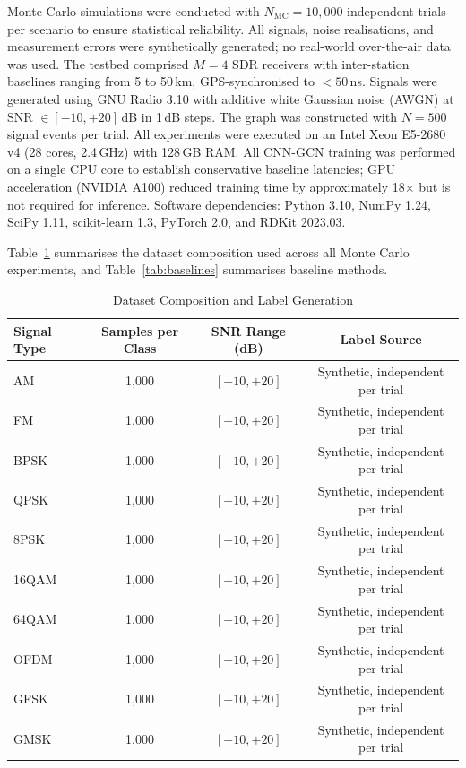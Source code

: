 \documentclass[sensors,article,submit,pdftex]{mdpi}
\begin{document}
Monte Carlo simulations were conducted with $N_{\text{MC}} = 10{,}000$ independent trials per scenario to ensure statistical reliability. All signals, noise realisations, and measurement errors were synthetically generated; no real-world over-the-air data was used. The testbed comprised $M = 4$ SDR receivers with inter-station baselines ranging from 5 to 50\,km, GPS-synchronised to $< 50$\,ns. Signals were generated using GNU Radio 3.10 with additive white Gaussian noise (AWGN) at SNR $\in [-10, +20]$\,dB in 1\,dB steps. The graph was constructed with $N = 500$ signal events per trial. All experiments were executed on an Intel Xeon E5-2680 v4 (28 cores, 2.4\,GHz) with 128\,GB RAM. All CNN-GCN training was performed on a single CPU core to establish conservative baseline latencies; GPU acceleration (NVIDIA A100) reduced training time by approximately 18$\times$ but is not required for inference. Software dependencies: Python 3.10, NumPy 1.24, SciPy 1.11, scikit-learn 1.3, PyTorch 2.0, and RDKit 2023.03.

Table~\ref{tab:dataset} summarises the dataset composition used across all Monte Carlo experiments, and Table~\ref{tab:baselines} summarises baseline methods.

\begin{table}[H]
    \centering
    \caption{Dataset Composition and Label Generation}
    \label{tab:dataset}
    \small
    \begin{tabular}{@{}lccc@{}}
        \toprule
        \textbf{Signal Type} & \textbf{Samples per Class} & \textbf{SNR Range (dB)} & \textbf{Label Source} \\
        \midrule
        AM & 1,000 & $[-10, +20]$ & Synthetic, independent per trial \\
        FM & 1,000 & $[-10, +20]$ & Synthetic, independent per trial \\
        BPSK & 1,000 & $[-10, +20]$ & Synthetic, independent per trial \\
        QPSK & 1,000 & $[-10, +20]$ & Synthetic, independent per trial \\
        8PSK & 1,000 & $[-10, +20]$ & Synthetic, independent per trial \\
        16QAM & 1,000 & $[-10, +20]$ & Synthetic, independent per trial \\
        64QAM & 1,000 & $[-10, +20]$ & Synthetic, independent per trial \\
        OFDM & 1,000 & $[-10, +20]$ & Synthetic, independent per trial \\
        GFSK & 1,000 & $[-10, +20]$ & Synthetic, independent per trial \\
        GMSK & 1,000 & $[-10, +20]$ & Synthetic, independent per trial \\
        \bottomrule
    \end{tabular}
\end{table}
\end{document}
